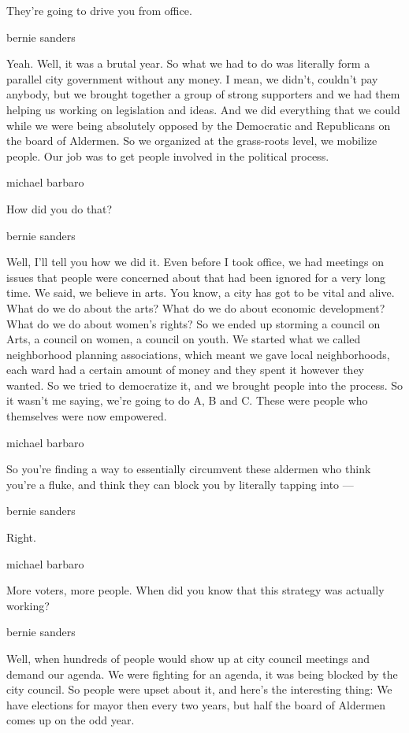 They're going to drive you from office.

bernie sanders

Yeah. Well, it was a brutal year. So what we had to do was literally
form a parallel city government without any money. I mean, we didn't,
couldn't pay anybody, but we brought together a group of strong
supporters and we had them helping us working on legislation and ideas.
And we did everything that we could while we were being absolutely
opposed by the Democratic and Republicans on the board of Aldermen. So
we organized at the grass-roots level, we mobilize people. Our job was
to get people involved in the political process.

michael barbaro

How did you do that?

bernie sanders

Well, I'll tell you how we did it. Even before I took office, we had
meetings on issues that people were concerned about that had been
ignored for a very long time. We said, we believe in arts. You know, a
city has got to be vital and alive. What do we do about the arts? What
do we do about economic development? What do we do about women's rights?
So we ended up storming a council on Arts, a council on women, a council
on youth. We started what we called neighborhood planning associations,
which meant we gave local neighborhoods, each ward had a certain amount
of money and they spent it however they wanted. So we tried to
democratize it, and we brought people into the process. So it wasn't me
saying, we're going to do A, B and C. These were people who themselves
were now empowered.

michael barbaro

So you're finding a way to essentially circumvent these aldermen who
think you're a fluke, and think they can block you by literally tapping
into ---

bernie sanders

Right.

michael barbaro

More voters, more people. When did you know that this strategy was
actually working?

bernie sanders

Well, when hundreds of people would show up at city council meetings and
demand our agenda. We were fighting for an agenda, it was being blocked
by the city council. So people were upset about it, and here's the
interesting thing: We have elections for mayor then every two years, but
half the board of Aldermen comes up on the odd year.

